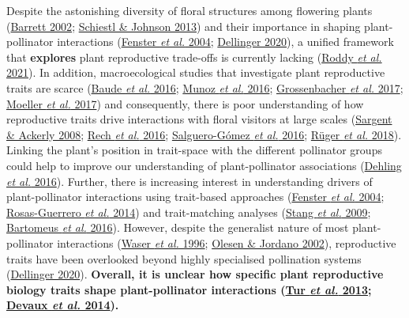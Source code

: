 \documentclass[
  12pt,
  a4paper,
]{article}
\begin{document}
Despite the astonishing diversity of floral structures among flowering plants (\protect\hyperlink{ref-barrett2002}{Barrett 2002}; \protect\hyperlink{ref-schiestl2013}{Schiestl \& Johnson 2013}) and their importance in shaping plant-pollinator interactions (\protect\hyperlink{ref-fenster2004}{Fenster \emph{et al.} 2004}; \protect\hyperlink{ref-dellinger2020}{Dellinger 2020}), a unified framework that \textbf{explores} plant reproductive trade-offs is currently lacking (\protect\hyperlink{ref-roddy2021}{Roddy \emph{et al.} 2021}). In addition, macroecological studies that investigate plant reproductive traits are scarce (\protect\hyperlink{ref-baude2016}{Baude \emph{et al.} 2016}; \protect\hyperlink{ref-munoz2016}{Munoz \emph{et al.} 2016}; \protect\hyperlink{ref-grossenbacher2017}{Grossenbacher \emph{et al.} 2017}; \protect\hyperlink{ref-moeller2017}{Moeller \emph{et al.} 2017}) and consequently, there is poor understanding of how reproductive traits drive interactions with floral visitors at large scales (\protect\hyperlink{ref-sargent2008}{Sargent \& Ackerly 2008}; \protect\hyperlink{ref-rech2016}{Rech \emph{et al.} 2016}; \protect\hyperlink{ref-salguero2016}{Salguero-Gómez \emph{et al.} 2016}; \protect\hyperlink{ref-ruger2018}{Rüger \emph{et al.} 2018}). Linking the plant's position in trait-space with the different pollinator groups could help to improve our understanding of plant-pollinator associations (\protect\hyperlink{ref-dehling2016}{Dehling \emph{et al.} 2016}). Further, there is increasing interest in understanding drivers of plant-pollinator interactions using trait-based approaches (\protect\hyperlink{ref-fenster2004}{Fenster \emph{et al.} 2004}; \protect\hyperlink{ref-rosas2014}{Rosas-Guerrero \emph{et al.} 2014}) and trait-matching analyses (\protect\hyperlink{ref-stang2009}{Stang \emph{et al.} 2009}; \protect\hyperlink{ref-bartomeus2016}{Bartomeus \emph{et al.} 2016}). However, despite the generalist nature of most plant-pollinator interactions (\protect\hyperlink{ref-waser1996}{Waser \emph{et al.} 1996}; \protect\hyperlink{ref-olesen2002}{Olesen \& Jordano 2002}), reproductive traits have been overlooked beyond highly specialised pollination systems (\protect\hyperlink{ref-dellinger2020}{Dellinger 2020}). \textbf{Overall, it is unclear how specific plant reproductive biology traits shape plant-pollinator interactions (\protect\hyperlink{ref-tur2013}{Tur \emph{et al.} 2013}; \protect\hyperlink{ref-devaux2014}{Devaux \emph{et al.} 2014}).}
\end{document}
